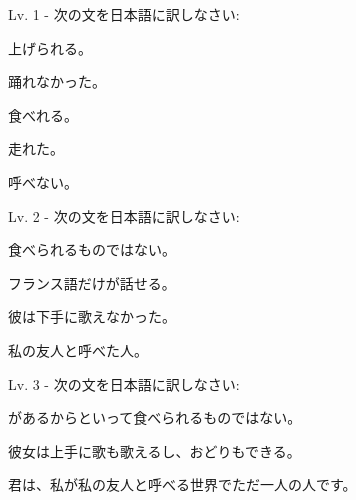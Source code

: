 
\author{Kristijan Čavić}

	
	\begin{mondai}{Lv. 1 - 次の文を日本語に訳しなさい: }
		\item 上げられる。
		\item 踊れなかった。
		\item 食べれる。
		\item 走れた。
		\item 呼べない。
	\end{mondai}
	
	\begin{mondai}{Lv. 2 - 次の文を日本語に訳しなさい:}
		\item 食べられるものではない。
		\item フランス語だけが話せる。
		\item 彼は下手に歌えなかった。
		\item 私の友人と呼べた人。
	\end{mondai}
	
	\begin{mondai}{Lv. 3 - 次の文を日本語に訳しなさい:}
		\item {}があるからといって食べられるものではない。
		\item 彼女は上手に歌も歌えるし、おどりもできる。
		\item 君は、私が私の友人と呼べる世界でただ一人の人です。
	\end{mondai}

